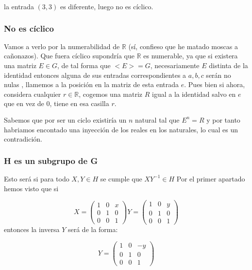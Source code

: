 \documentclass[12pt]{article}
\begin{document}
la entrada $(3,3)$ es diferente, luego no es cíclico.


\subsubsection*{No es cíclico}


Vamos a verlo por la numerabilidad de $\mathbb R$
(sí, confieso que he matado moscas a cañonazos).
Que fuera cíclico supondría que $\mathbb R$ es numerable, 
ya que si existera una matriz $E \in G$, 
de tal forma que $<E>=G$, necesariamente $E$ distinta de la identidad
entonces alguna de sus entradas correspondientes a $a,b,c$ serán no nulas 
, llamemos a la posición en la matriz de esta entrada $e$.
Pues bien si ahora, considera cualquier $r \in \mathbb R$, cogemos una matriz $R$
igual a la identidad salvo en $e$ que en vez de $0$, tiene en esa casilla $r.$

Sabemos que por ser un ciclo existiría un $n$ natural tal que $E^n = R$
y por tanto habriamos encontado una inyección de los reales en los naturales, lo cual
es un contradición. 

\subsubsection*{H es un subgrupo de G}
Esto será si para todo $X,Y \in H$ se cumple que $X Y^{-1} \in H$
Por el primer apartado hemos visto que si 

\begin{equation*}
    X = 
    \begin{pmatrix}
        1 & 0 & x \\
        0 & 1 & 0 \\
        0 & 0 & 1
    \end{pmatrix}
    Y = 
    \begin{pmatrix}
        1 & 0 & y \\
        0 & 1 & 0 \\
        0 & 0 & 1
    \end{pmatrix}
\end{equation*}
entonces la inversa $Y$ será de la forma: 

\begin{equation*}
    Y = 
    \begin{pmatrix}
        1 & 0 & -y \\
        0 & 1 & 0 \\
        0 & 0 & 1
    \end{pmatrix}
\end{equation*}
\end{document}
